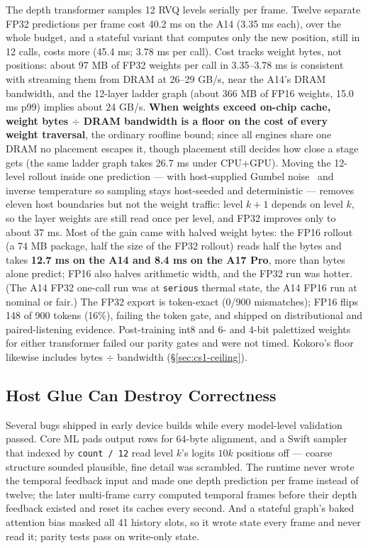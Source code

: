 \documentclass[11pt]{article}
\newcommand{\code}[1]{\texttt{#1}}
\begin{document}
The depth transformer samples 12 RVQ levels serially per frame. Twelve separate FP32 predictions per frame cost 40.2 ms on the A14 (3.35 ms each), over the whole budget, and a stateful variant that computes only the new position, still in 12 calls, costs more (45.4 ms; 3.78 ms per call). Cost tracks weight bytes, not positions: about 97 MB of FP32 weights per call in 3.35--3.78 ms is consistent with streaming them from DRAM at 26--29 GB/s, near the A14's DRAM bandwidth, and the 12-layer ladder graph (about 366 MB of FP16 weights, 15.0 ms p99) implies about 24 GB/s. \textbf{When weights exceed on-chip cache, weight bytes $\div$ DRAM bandwidth is a floor on the cost of every weight traversal}, the ordinary roofline bound; since all engines share one DRAM no placement escapes it, though placement still decides how close a stage gets (the same ladder graph takes 26.7 ms under CPU+GPU). Moving the 12-level rollout inside one prediction --- with host-supplied Gumbel noise~\citep{astar-sampling} and inverse temperature so sampling stays host-seeded and deterministic --- removes eleven host boundaries but not the weight traffic: level $k{+}1$ depends on level $k$, so the layer weights are still read once per level, and FP32 improves only to about 37 ms. Most of the gain came with halved weight bytes: the FP16 rollout (a 74 MB package, half the size of the FP32 rollout) reads half the bytes and takes \textbf{12.7 ms on the A14 and 8.4 ms on the A17 Pro}, more than bytes alone predict; FP16 also halves arithmetic width, and the FP32 run was hotter. (The A14 FP32 one-call run was at \code{serious} thermal state, the A14 FP16 run at nominal or fair.) The FP32 export is token-exact (0/900 mismatches); FP16 flips 148 of 900 tokens (16\%), failing the token gate, and shipped on distributional and paired-listening evidence. Post-training int8 and 6- and 4-bit palettized weights for either transformer failed our parity gates and were not timed. Kokoro's floor likewise includes bytes $\div$ bandwidth (\S\ref{sec:cs1-ceiling}).

\subsection{Host Glue Can Destroy Correctness}\label{sec:cs2-host}

Several bugs shipped in early device builds while every model-level validation passed. Core ML pads output rows for 64-byte alignment, and a Swift sampler that indexed by \code{count / 12} read level $k$'s logits $10k$ positions off --- coarse structure sounded plausible, fine detail was scrambled. The runtime never wrote the temporal feedback input and made one depth prediction per frame instead of twelve; the later multi-frame carry computed temporal frames before their depth feedback existed and reset its caches every second. And a stateful graph's baked attention bias masked all 41 history slots, so it wrote state every frame and never read it; parity tests pass on write-only state.
\end{document}
